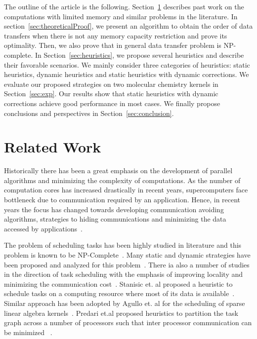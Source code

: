 \documentclass[runningheads]{llncs} %
\begin{document}
The outline of the article is the following. Section~\ref{sec:relatedWork} describes past work on the computations with limited memory and similar problems in the literature. In section~\ref{sec:theoreticalProof}, we present an algorithm to obtain the order of data transfers when there is not any memory capacity restriction and prove its optimality. Then, we also prove that in general data transfer problem is NP-complete. In Section~\ref{sec:heuristics}, we propose several heuristics and describe their favorable scenarios. We mainly consider three categories of heuristics: static heuristics, dynamic heuristics and static heuristics with dynamic corrections. We evaluate our proposed strategies on two molecular chemistry kernels in Section~\ref{sec:exp}.  Our results show that static heuristics with dynamic corrections achieve good performance in most cases. We finally  propose conclusions and perspectives in Section~\ref{sec:conclusion}.

\section{Related Work}
\label{sec:relatedWork}

Historically there has been a great emphasis on the development of parallel algorithms and minimizing the complexity of computations. As the number of computation cores has increased drastically in recent years, supercomputers face bottleneck due to communication required by an application. Hence, in recent years the focus has changed towards developing communication avoiding algorithms, strategies to hiding communications and  minimizing the data accessed by applications~\cite{yelick2016}. 

  
The problem of scheduling tasks has been highly studied in literature and this problem is known to be NP-Complete~\cite{GareyJohnson}.  Many static and dynamic strategies have been proposed and analyzed for this problem~\cite{heft-Topcuoglu,hipc16multiresource,ipdps16starpu}. There ia also a number of studies in the direction of task scheduling with the emphasis of improving locality and minimizing the communication cost~\cite{starpu,heft-Topcuoglu}. Stanisic et. al proposed a heuristic to schedule tasks on a computing resource where most of its data is available~\cite{luka-dmdar}. Similar approach has been adopted by Agullo et. al for the scheduling of sparse linear algebra kernels~\cite{agullo_fmm}.  Predari et.al  proposed  heuristics to  partition the task graph across a number of processors such that inter processor communication can be minimized ~\cite{predari:tel-01518956}.
\end{document}
